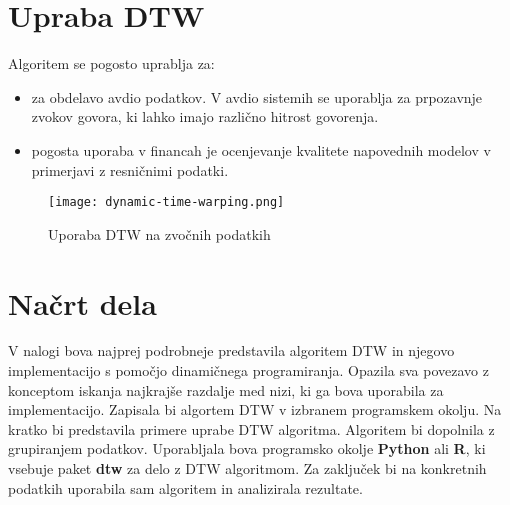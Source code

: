 \documentclass{article}
\begin{document}
 \section{Upraba DTW}
Algoritem se pogosto uprablja za:
\begin{itemize}
    \item  za obdelavo avdio podatkov. V avdio sistemih se uporablja za prpozavnje zvokov govora, ki lahko imajo različno hitrost govorenja.  
    \item pogosta uporaba v financah je ocenjevanje kvalitete napovednih modelov v primerjavi z resničnimi podatki. 
\end{itemize}


\begin{figure}[h!]
    \centering
    \texttt{[image: dynamic-time-warping.png]}
    \caption{Uporaba DTW na zvočnih podatkih}
\end{figure}


\section{Načrt dela}
V nalogi bova najprej podrobneje predstavila algoritem DTW in njegovo implementacijo s pomočjo dinamičnega programiranja. 
Opazila sva povezavo z konceptom iskanja najkrajše razdalje med nizi, ki ga bova uporabila za implementacijo. 
Zapisala bi algortem DTW v izbranem programskem okolju. Na kratko bi predstavila primere uprabe DTW algoritma. 
Algoritem bi dopolnila z grupiranjem podatkov. Uporabljala bova programsko okolje \textbf{Python} ali \textbf{R}, 
ki vsebuje paket \textbf{dtw} za delo z DTW algoritmom.
Za zaključek bi na konkretnih podatkih uporabila sam algoritem in analizirala rezultate. 
\end{document}
